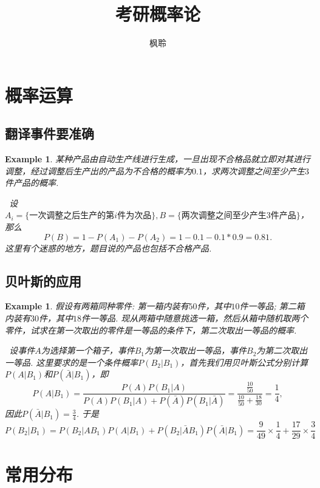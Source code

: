 \documentclass{article}
\newtheorem{example}[theorem]{Example}
\newcommand{\hints}{{\color{blue} \text{hints}}}
\begin{document}
\title{考研概率论}
\author{枫聆}
\maketitle

\tableofcontents

\newpage
\section{概率运算}

\subsection{翻译事件要准确}

\begin{example}
\rm 某种产品由自动生产线进行生成，一旦出现不合格品就立即对其进行调整，经过调整后生产出的产品为不合格的概率为$0.1$，求两次调整之间至少产生$3$件产品的概率. 

\hints\ 设$A_i = \{\text{一次调整之后生产的第$i$件为次品}\}, B=\{\text{两次调整之间至少产生$3$件产品}\}$，那么
$$
P(B) =  1- P(A_1) - P(A_2) = 1-0.1-0.1*0.9 = 0.81. 
$$
这里有个迷惑的地方，题目说的产品也包括不合格产品. 
\end{example}

\subsection{贝叶斯的应用}

\begin{example}
\rm 假设有两箱同种零件: 第一箱内装有$50$件，其中$10$件一等品; 第二箱内装有$30$件，其中$18$件一等品. 现从两箱中随意挑选一箱，然后从箱中随机取两个零件，试求在第一次取出的零件是一等品的条件下，第二次取出一等品的概率.

\hints\ 设事件$A$为选择第一个箱子，事件$B_1$为第一次取出一等品，事件$B_2$为第二次取出一等品. 这里要求的是一个条件概率$P(B_2|B_1)$，首先我们用贝叶斯公式分别计算$P(A|B_1)$和$P(\bar{A}|B_1)$，即
$$
P(A|B_1) = \frac{P(A)P(B_1|A)}{P(A)P(B_1|A) + P(\bar{A})P(B_1|\bar{A})} = \frac{\frac{10}{50}}{\frac{10}{50} + \frac{18}{30}} = \frac{1}{4},
$$ 
因此$P(\bar{A}|B_1) = \frac{3}{4}$. 于是
$$
P(B_2|B_1) = P(B_2|AB_1)P(A|B_1) + P(B_2|\bar{A}B_1)P(\bar{A}|B_1) = \frac{9}{49}\times\frac{1}{4} + \frac{17}{29} \times \frac{3}{4}
$$
\end{example}

\newpage
\section{常用分布}
\end{document}
